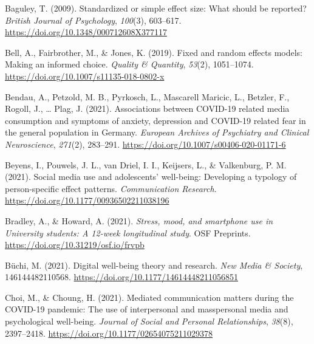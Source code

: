 \documentclass[
  man,mask]{apa6}
\newlength{\cslhangindent}
\newlength{\cslentryspacingunit} %
\newenvironment{CSLReferences}[2] %
 {%
  \setlength{\parindent}{0pt}
  \ifodd #1
  \let\oldpar\par
  \def\par{\hangindent=\cslhangindent\oldpar}
  \fi
  \setlength{\parskip}{#2\cslentryspacingunit}
 }%
 {}
\begin{document}
\hypertarget{refs}{}
\begin{CSLReferences}{1}{0}
\leavevmode{}%
Baguley, T. (2009). Standardized or simple effect size: {What} should be reported? \emph{British Journal of Psychology}, \emph{100}(3), 603--617. \url{https://doi.org/10.1348/000712608X377117}

\leavevmode{}%
Bell, A., Fairbrother, M., \& Jones, K. (2019). Fixed and random effects models: Making an informed choice. \emph{Quality \& Quantity}, \emph{53}(2), 1051--1074. \url{https://doi.org/10.1007/s11135-018-0802-x}

\leavevmode{}%
Bendau, A., Petzold, M. B., Pyrkosch, L., Mascarell Maricic, L., Betzler, F., Rogoll, J., \ldots{} Plag, J. (2021). Associations between {COVID-19} related media consumption and symptoms of anxiety, depression and {COVID-19} related fear in the general population in {Germany}. \emph{European Archives of Psychiatry and Clinical Neuroscience}, \emph{271}(2), 283--291. \url{https://doi.org/10.1007/s00406-020-01171-6}

\leavevmode{}%
Beyens, I., Pouwels, J. L., van Driel, I. I., Keijsers, L., \& Valkenburg, P. M. (2021). Social media use and adolescents' well-being: {Developing} a typology of person-specific effect patterns. \emph{Communication Research}. \url{https://doi.org/10.1177/00936502211038196}

\leavevmode{}%
Bradley, A., \& Howard, A. (2021). \emph{Stress, mood, and smartphone use in {University} students: {A} 12-week longitudinal study}. {OSF Preprints}. \url{https://doi.org/10.31219/osf.io/frvpb}

\leavevmode{}%
Büchi, M. (2021). Digital well-being theory and research. \emph{New Media \& Society}, 146144482110568. \url{https://doi.org/10.1177/14614448211056851}

\leavevmode{}%
Choi, M., \& Choung, H. (2021). Mediated communication matters during the {COVID-19} pandemic: {The} use of interpersonal and masspersonal media and psychological well-being. \emph{Journal of Social and Personal Relationships}, \emph{38}(8), 2397--2418. \url{https://doi.org/10.1177/02654075211029378}


\end{CSLReferences}
\end{document}
